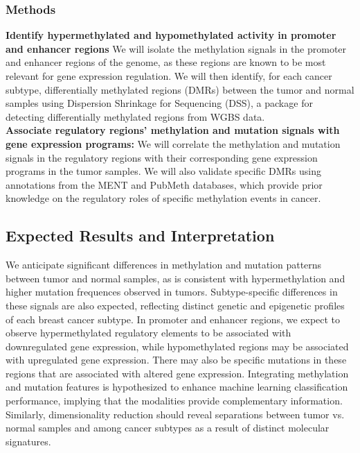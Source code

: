 \documentclass[11pt]{article}
\begin{document}
\subsubsection*{Methods}
\textbf{Identify hypermethylated and hypomethylated activity in promoter and enhancer regions} We will isolate the methylation signals in the promoter and enhancer regions of the genome, as these regions are known to be most relevant for gene expression regulation. 
We will then identify, for each cancer subtype, differentially methylated regions (DMRs) between the tumor and normal samples using Dispersion Shrinkage for Sequencing (DSS), a package for detecting differentially methylated regions from WGBS data. 
\medskip \\
\textbf{Associate regulatory regions' methylation and mutation signals with gene expression programs:} We will correlate the methylation and mutation signals in the regulatory regions with their corresponding gene expression programs in the tumor samples. We will also validate specific DMRs using annotations from the MENT and PubMeth databases, which provide prior knowledge on the regulatory roles of specific methylation events in cancer.




\subsection*{Expected Results and Interpretation}
We anticipate significant differences in methylation and mutation patterns between tumor and normal samples, as is consistent with hypermethylation and higher mutation frequences observed in tumors.
Subtype-specific differences in these signals are also expected, reflecting distinct genetic and epigenetic profiles of each breast cancer subtype.
In promoter and enhancer regions, we expect to observe hypermethylated regulatory elements to be associated with downregulated gene expression, while hypomethylated regions may be associated with upregulated gene expression. There may also be specific mutations in these regions that are associated with altered gene expression.
Integrating methylation and mutation features is hypothesized to enhance machine learning classification performance, implying that the modalities provide complementary information. Similarly, dimensionality reduction should reveal separations between tumor vs. normal samples and among cancer subtypes as a result of distinct molecular signatures.
\end{document}
